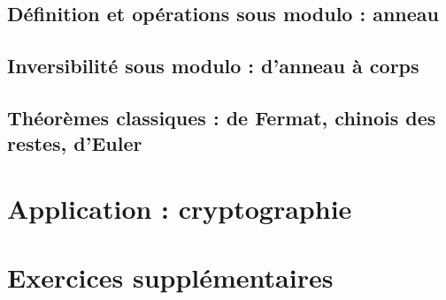 \subsection{Définition et opérations sous modulo : anneau}

\subsection{Inversibilité sous modulo : d'anneau à corps}

\subsection{Théorèmes classiques : de Fermat, chinois des restes, d'Euler}

\section{Application : cryptographie}



\section*{Exercices supplémentaires}


%




